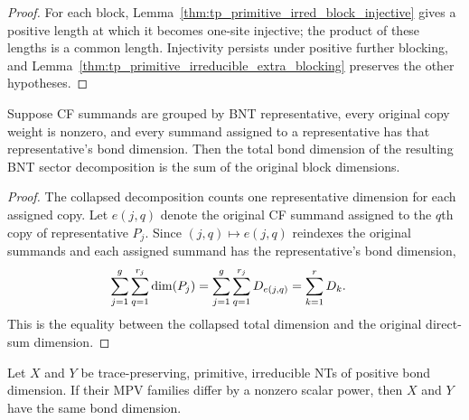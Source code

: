 \begin{proof}\leanok
    For each block,
    Lemma~\ref{thm:tp_primitive_irred_block_injective} gives a positive length
    at which it becomes one-site injective; the product of these lengths is a
    common length. Injectivity persists under positive further blocking, and
    Lemma~\ref{thm:tp_primitive_irreducible_extra_blocking} preserves the other
    hypotheses.
\end{proof}

\begin{lemma}%
    \label{lem:collapsed_bnt_sector_decomp_total_dim}
    \leanok
    Suppose CF summands are grouped by BNT representative, every original copy
    weight is nonzero, and every summand assigned to a representative has that
    representative's bond dimension. Then the total bond dimension of the
    resulting BNT sector decomposition is the sum of the original block
    dimensions.
\end{lemma}

\begin{proof}\leanok
    The collapsed decomposition counts one representative dimension for each
    assigned copy. Let $e(j,q)$ denote the original CF summand assigned to the
    $q$th copy of representative $P_j$. Since $(j,q)\mapsto e(j,q)$ reindexes
    the original summands and each assigned summand has the representative's bond
    dimension,
    \begin{align}
        \sum_{j=1}^{g}\sum_{q=1}^{r_j}\dim(P_j)
         & =
        \sum_{j=1}^{g}\sum_{q=1}^{r_j}D_{e(j,q)}
        =
        \sum_{k=1}^{r}D_k.
        \notag
    \end{align}
    This is the equality between the collapsed total dimension and the original
    direct-sum dimension.
\end{proof}

\begin{lemma}%
    \label{lem:prepared_phase_equiv_dim_eq}
    \leanok
    Let $X$ and $Y$ be trace-preserving, primitive, irreducible NTs of positive
    bond dimension. If their MPV families differ by a nonzero scalar power, then
    $X$ and $Y$ have the same bond dimension.
\end{lemma}

